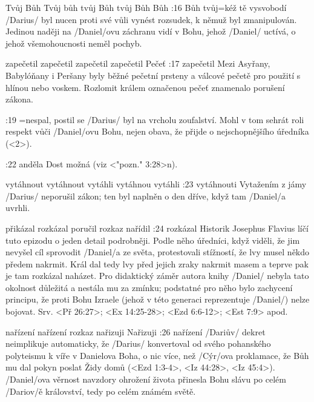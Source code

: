     {Tvůj Bůh}  %
    {Tvůj bůh}  %
    {tvůj Bůh}  %
    {tvůj Bůh}  %
    {Bůh}  %
:16 {Bůh tvůj}={kéž tě vysvobodí} \x/Darius/ byl nucen proti své vůli vynést rozsudek, k němuž byl zmanipulován. Jedinou naději na \x/Daniel/ovu záchranu vidí v Bohu, jehož \x/Daniel/ uctívá, o jehož všemohoucnosti neměl pochyb. %

    {zapečetil} %
    {zapečetil}  %
    {zapečetil} %
    {zapečetil}  %
    {Pečeť}  %
:17 {zapečetil} Mezi Asyřany, Babylóňany i Peršany byly běžné pečetní prsteny a válcové pečetě pro použití s hlínou nebo voskem. Rozlomit králem označenou pečeť znamenalo porušení zákona.

:19 {}={nespal, postil se} \x/Darius/ byl na vrcholu zoufalství. Mohl v tom sehrát roli respekt vůči \x/Daniel/ovu Bohu, nejen obava, že přijde o nejschopnějšího úředníka (<2>).     

:22 {anděla}  Dost možná   (viz <"pozn." 3:28>n).

    {vytáhnout}  %
    {vytáhnout}  %
    {vytáhli}  %
    {vytáhnou}  %
    {vytáhli}  %
:23 {vytáhnouti} Vytažením z jámy \x/Darius/ neporušil zákon; ten byl naplněn o den dříve, když tam \x/Daniel/a uvrhli. 

    {přikázal}  %
    {rozkázal}  %
    {poručil}  %
    {rozkaz}  %
    {nařídil}  %
:24 {rozkázal} Historik Josephus Flavius líčí tuto epizodu o jeden detail podrobněji. Podle něho úředníci, když viděli, že jim nevyšel cíl sprovodit \x/Daniel/a ze světa, protestovali stížností, že lvy musel někdo předem nakrmit. Král dal tedy lvy před jejich zraky nakrmit masem a teprve pak je tam rozkázal naházet. Pro didaktický záměr autora knihy \x/Daniel/ nebyla tato okolnost důležitá a nestála mu za zmínku; podstatné pro něho bylo zachycení principu, že proti Bohu Izraele (jehož v této generaci reprezentuje \x/Daniel/) nelze bojovat. Srv. <Př 26:27>;  <Ex 14:25-28>; <Ezd 6:6-12>;  <Est 7:9> apod. 

    {nařízení} %
    {nařízení}  %
    {rozkaz} %
    {nařizuji}  %
    {Nařizuji}  %
:26 {nařízení} 
     \x/Dariův/ dekret neimplikuje automaticky, že \x/Darius/ konvertoval od svého
     pohanského polyteismu k víře v Danielova Boha, o nic více, než \x/Cýr/ova proklamace, že Bůh mu dal pokyn poslat Židy domů (<Ezd 1:3-4>, <Iz 44:28>, <Iz 45:4>).
     \x/Daniel/ova věrnost navzdory ohrožení života přinesla Bohu slávu po celém \x/Dariov/ě království, tedy po celém známém světě.  

